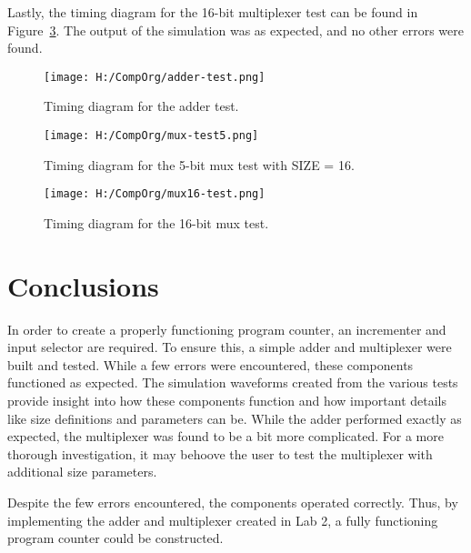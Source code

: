 \documentclass{article}
\begin{document}
Lastly, the timing diagram for the 16-bit multiplexer test can be found in Figure~\ref{fig:mux16test}. The output of the simulation was as expected, and no other errors were found.


\begin{figure}
\begin{center}
\caption{Timing diagram for the adder test.}\label{fig:addertest}
\texttt{[image: H:/CompOrg/adder-test.png]}
\end{center}
\end{figure}

\begin{figure}
	\begin{center}
		\caption{Timing diagram for the 5-bit mux test with SIZE = 16.}\label{fig:mux5test}
		\texttt{[image: H:/CompOrg/mux-test5.png]}
	\end{center}
\end{figure}

\begin{figure}
\begin{center}
\caption{Timing diagram for the 16-bit mux test.}\label{fig:mux16test}
\texttt{[image: H:/CompOrg/mux16-test.png]}
\end{center}
\end{figure}



\section{Conclusions}
In order to create a properly functioning program counter, an incrementer and input selector are required. To ensure this, a simple adder and multiplexer were built and tested. While a few errors were encountered, these components functioned as expected. The simulation waveforms created from the various tests provide insight into how these components function and how important details like size definitions and parameters can be. While the adder performed exactly as expected, the multiplexer was found to be a bit more complicated. For a more thorough investigation, it may behoove the user to test the multiplexer with additional size parameters. 

Despite the few errors encountered, the components operated correctly. Thus, by implementing the adder and multiplexer created in Lab 2, a fully functioning program counter could be constructed.
\end{document}
